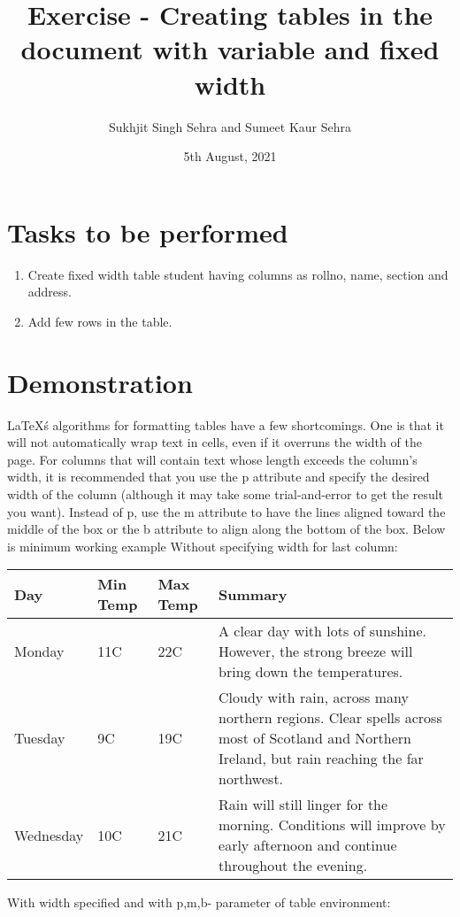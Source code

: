 \documentclass{article}
\title{Exercise  - Creating tables in the document with variable and fixed width}
\author{Sukhjit Singh Sehra and Sumeet Kaur Sehra}
\date{5th August, 2021}
\begin{document}
	\maketitle	
	
	\section*{Tasks to be performed}
	\begin{enumerate}	
		\item Create fixed width table student having columns as rollno, name, section and address.
		\item Add few rows in the table.
	\end{enumerate}
	\section*{Demonstration}
	\LaTeX\'s algorithms for formatting tables have a few shortcomings. One is that it will not automatically wrap text in cells, even if it overruns the width of the page. For columns that will contain text whose length exceeds the column's width, it is recommended that you use the p attribute and specify the desired width of the column (although it may take some trial-and-error to get the result you want).
	Instead of p, use the m attribute to have the lines aligned toward the middle of the box or the b attribute to align along the bottom of the box. Below is minimum working example
Without specifying width for last column:
\begin{center}
    \begin{tabular}{| l | l | l | l |}
    \hline
    Day & Min Temp & Max Temp & Summary \\ \hline
    Monday & 11C & 22C & A clear day with lots of sunshine.
    However, the strong breeze will bring down the temperatures. \\ \hline
    Tuesday & 9C & 19C & Cloudy with rain, across many northern regions. Clear spells 
    across most of Scotland and Northern Ireland, 
    but rain reaching the far northwest. \\ \hline
    Wednesday & 10C & 21C & Rain will still linger for the morning. 
    Conditions will improve by early afternoon and continue 
    throughout the evening. \\
    \hline
    \end{tabular}
\end{center}
\newpage
With width specified and with p,m,b- parameter of table environment:
\end{document}
